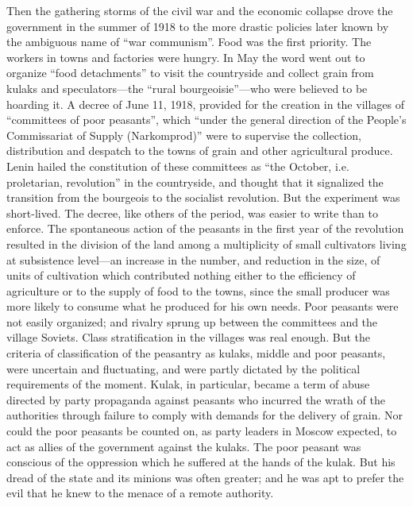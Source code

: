 Then the gathering storms of the civil war and the economic collapse drove the government in the summer of 1918 to the more drastic policies later known by the ambiguous name of ``war communism''. Food was the first priority. The workers in towns and factories were hungry. In May the word went out to organize ``food detachments'' to visit the countryside and collect grain from kulaks and speculators---the ``rural bourgeoisie''---who were believed to be hoarding it. A decree of June 11, 1918, provided for the creation in the villages of ``committees of poor peasants'', which ``under the general direction of the People's Commissariat of Supply (Narkomprod)'' were to supervise the collection, distribution and despatch to the towns of grain and other agricultural produce. Lenin hailed the constitution of these committees as ``the October, i.e. proletarian, revolution'' in the countryside, and thought that it signalized the transition from the bourgeois to the socialist revolution. But the experiment was short-lived. The decree, like others of the period, was easier to write than to enforce. The spontaneous action of the peasants in the first year of the revolution resulted in the division of the land among a multiplicity of small cultivators living at subsistence level---an increase in the number, and reduction in the size, of units of cultivation which contributed nothing either to the efficiency of agriculture or to the supply of food to the towns, since the small producer was more likely to consume what he produced for his own needs. Poor peasants were not easily organized; and rivalry sprung up between the committees and the village Soviets. Class stratification in the villages was real enough. But the criteria of classification of the peasantry as kulaks, middle and poor peasants, were uncertain and fluctuating, and were partly dictated by the political requirements of the moment. Kulak, in particular, became a term of abuse directed by party propaganda against peasants who incurred the wrath of the authorities through failure to comply with demands for the delivery of grain. Nor could the poor peasants be counted on, as party leaders in Moscow expected, to act as allies of the government against the kulaks. The poor peasant was conscious of the oppression which he suffered at the hands of the kulak. But his dread of the state and its minions was often greater; and he was apt to prefer the evil that he knew to the menace of a remote authority. 

